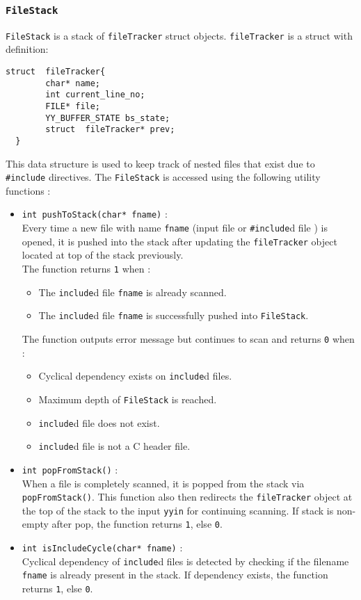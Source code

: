 \documentclass[12pt]{article}
\begin{document}
\subsubsection{\texttt{FileStack}}
\label{FS}
\texttt{FileStack} is a stack of \texttt{fileTracker} struct objects. \texttt{fileTracker} is a struct with definition:
\begin{verbatim}
struct  fileTracker{
        char* name;
        int current_line_no;
        FILE* file;
        YY_BUFFER_STATE bs_state;
        struct  fileTracker* prev;
  }
\end{verbatim}

This data structure is used to keep track of nested files that exist due to \texttt{\#include} directives. The \texttt{FileStack} is accessed using the following utility functions :
\begin{itemize}
\item  \texttt{int pushToStack(char* fname)} :
\\Every time a new file with name \texttt{fname} (input file or \texttt{\#include}d file ) is opened, it is pushed into the stack after updating the \texttt{fileTracker} object located at top of the stack previously.
\\The function returns \texttt{1} when :
\begin{itemize}
\item The \texttt{include}d file \texttt{fname} is already scanned.
\item The \texttt{include}d file \texttt{fname} is successfully pushed into \texttt{FileStack}.
\end{itemize}
The function outputs error message but continues to scan and returns \texttt{0} when :
\begin{itemize}
\item Cyclical dependency exists on \texttt{include}d files.
\item Maximum depth of \texttt{FileStack} is reached.
\item \texttt{include}d file does not exist.
\item \texttt{include}d file is not a C header file.
\end{itemize}

          
	
\item  \texttt{int popFromStack()} :
\\When a file is completely scanned, it is popped from the stack via \texttt{popFromStack()}. 
This function also then redirects the \texttt{fileTracker} object at the top of the stack to the input \texttt{yyin} for continuing scanning. If stack is non-empty after pop, the function returns \texttt{1}, else \texttt{0}.

\item	 \texttt{int isIncludeCycle(char* fname)} :
\\Cyclical dependency of \texttt{include}d files is detected by checking if the filename \texttt{fname} is already present in the stack. If dependency exists, the function returns \texttt{1}, else \texttt{0}.

\end{itemize}
\end{document}
